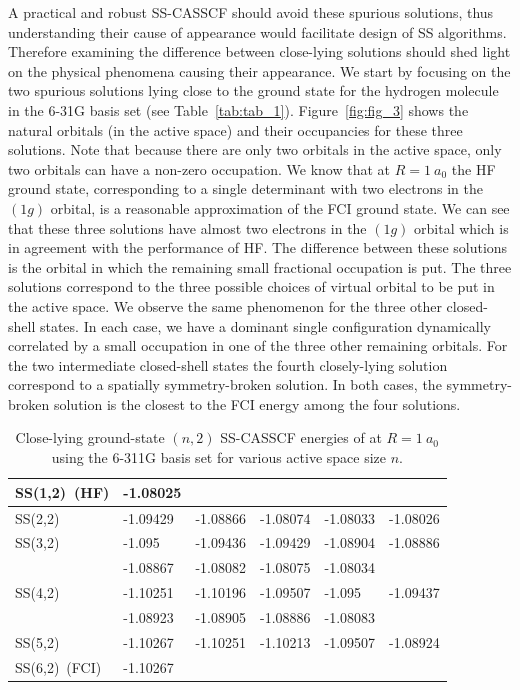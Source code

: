 \documentclass[aip,jcp,reprint,noshowkeys,superscriptaddress]{revtex4-1}
\begin{document}
A practical and robust SS-CASSCF should avoid these spurious solutions, thus understanding their cause of appearance would facilitate design of SS algorithms.
Therefore examining the difference between close-lying solutions should shed light on the physical phenomena causing their appearance.
We start by focusing on the two spurious solutions lying close to the ground state for the hydrogen molecule in the 6-31G basis set (see Table~\ref{tab:tab_1}).
Figure~\ref{fig:fig_3} shows the natural orbitals (in the active space) and their occupancies for these three solutions.
Note that because there are only two orbitals in the active space, only two orbitals can have a non-zero occupation.
We know that at $R=1~a_0$ the HF ground state, corresponding to a single determinant with two electrons in the $(1g)$ orbital, is a reasonable approximation of the FCI ground state.
We can see that these three solutions have almost two electrons in the $(1g)$ orbital which is in agreement with the performance of HF.
The difference between these solutions is the orbital in which the remaining small fractional occupation is put.
The three solutions correspond to the three possible choices of virtual orbital to be put in the active space.
We observe the same phenomenon for the three other closed-shell states.
In each case, we have a dominant single configuration dynamically correlated by a small occupation in one of the three other remaining orbitals.
For the two intermediate closed-shell states the fourth closely-lying solution correspond to a spatially symmetry-broken solution.
In both cases, the symmetry-broken solution is the closest to the FCI energy among the four solutions.

\begin{table}[b]
  \caption{Close-lying ground-state $(n,2)$ SS-CASSCF energies of  at $R=1~a_0$ using the 6-311G basis set for various active space size $n$.}
  \begin{ruledtabular}
    \label{tab:tab_2}
    \begin{tabular}{llllll}
      SS(1,2)~(HF) & -1.08025 & & & &\\
      \hline
      SS(2,2) & -1.09429 & -1.08866 & -1.08074 & -1.08033 & -1.08026 \\
      \hline
      SS(3,2) & -1.095 & -1.09436 & -1.09429 & -1.08904 & -1.08886 \\
                   & -1.08867 & -1.08082 & -1.08075 & -1.08034 & \\
      \hline
      SS(4,2) & -1.10251 & -1.10196 & -1.09507 & -1.095 & -1.09437 \\
          & -1.08923 & -1.08905 & -1.08886 & -1.08083 &  \\
      \hline
      SS(5,2) & -1.10267 & -1.10251 & -1.10213 & -1.09507 & -1.08924 \\
      \hline
      SS(6,2)~(FCI) & -1.10267 & & & &\\
    \end{tabular}
  \end{ruledtabular}
\end{table}
\end{document}
